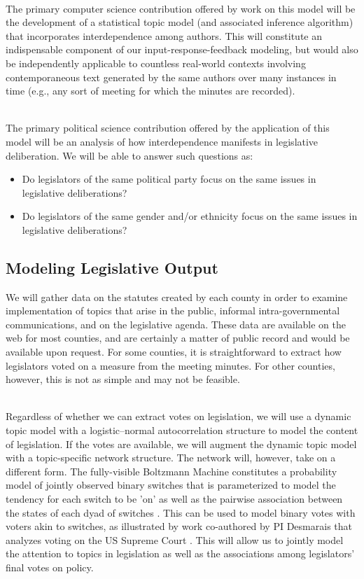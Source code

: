 ~\\
 The primary computer
science contribution offered by work on this model will be the
development of a statistical topic model (and associated inference
algorithm) that incorporates interdependence among authors. This will
constitute an indispensable component of our input-response-feedback
modeling, but would also be independently applicable to countless
real-world contexts involving contemporaneous text generated by the
same authors over many instances in time (e.g., any sort of meeting
for which the minutes are recorded).

~\\
 The primary political science contribution offered by the application of this model will be an analysis of how interdependence manifests in legislative deliberation. We will be able to answer such questions as:
\begin{itemize}
\item Do legislators of the same political party focus on the same issues in legislative deliberations?
\item Do legislators of the same gender and/or ethnicity focus on the same issues in legislative deliberations?
\end{itemize}


\subsection{Modeling Legislative Output}


  We will gather data on the statutes created by each county in order to examine implementation of topics that arise in the public, informal intra-governmental communications, and on the legislative agenda. These data are available on the web for most counties, and are certainly a matter of public record and would be available upon request. For some counties, it is straightforward to extract how legislators voted on a measure from the meeting minutes. For other counties, however, this is not as simple and may not be feasible.

~\\
 Regardless of whether we can
extract votes on legislation, we will use a dynamic topic model with a
logistic--normal autocorrelation structure to model the content of
legislation. If the votes are available, we will augment the dynamic
topic model with a topic-specific network structure. The network will,
however, take on a different form. The fully-visible Boltzmann Machine
constitutes a probability model of jointly observed binary switches
that is parameterized to model the tendency for each switch to be 'on'
as well as the pairwise association between the states of each dyad of
switches \cite{Gunawardana2008}. This can be used to model binary
votes with voters akin to switches, as illustrated by work co-authored
by PI Desmarais that analyzes voting on the US Supreme Court
\cite{Desmarais2010}. This will allow us to jointly model the
attention to topics in legislation as well as the associations among
legislators' final votes on policy.

